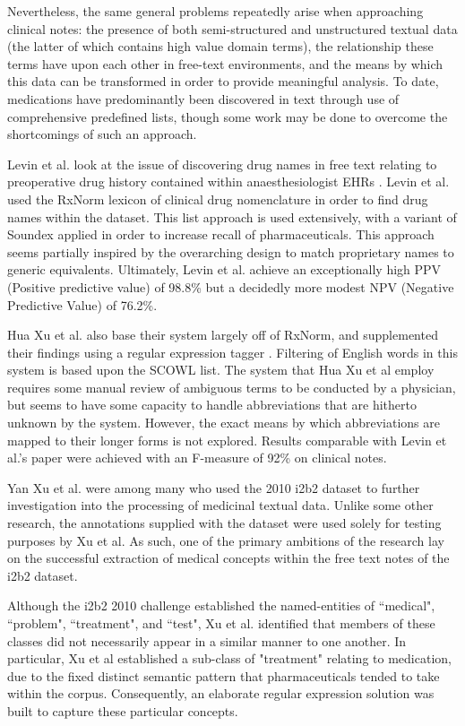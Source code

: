 Nevertheless, the same general problems repeatedly arise when approaching clinical notes: the presence of both semi-structured and unstructured textual data (the latter of which contains high value domain terms), the relationship these terms have upon each other in free-text environments, and the means by which this data can be transformed in order to provide meaningful analysis. To date, medications have predominantly been discovered in text through use of comprehensive predefined lists, though some work may be done to overcome the shortcomings of such an approach. 

Levin et al. look at the issue of discovering drug names in free text relating to preoperative drug history contained within anaesthesiologist EHRs \cite{levin2007extraction}. Levin et al. used the RxNorm lexicon of clinical drug nomenclature in order to find drug names within the dataset. This list approach is used extensively, with a variant of Soundex applied in order to increase recall of pharmaceuticals. This approach seems partially inspired by the overarching design to match proprietary names to generic equivalents. Ultimately, Levin et al. achieve an exceptionally high PPV (Positive predictive value) of 98.8\% but a decidedly more modest NPV (Negative Predictive Value) of 76.2\%. 

Hua Xu et al. also base their system largely off of RxNorm, and supplemented their findings using a regular expression tagger \cite{xu2010medex}. Filtering of English words in this system is based upon the SCOWL list. The system that Hua Xu et al employ requires some manual review of ambiguous terms to be conducted by a physician, but seems to have some capacity to handle abbreviations that are hitherto unknown by the system. However, the exact means by which abbreviations are mapped to their longer forms is not explored.  Results comparable with Levin et al.'s paper were achieved with an F-measure of 92\% on clinical notes. 

Yan Xu et al. were among many who used the 2010 i2b2 dataset to further investigation into the processing of medicinal textual data\cite{xu2012named}. Unlike some other research, the annotations supplied with the dataset were used solely for testing purposes by Xu et al. As such, one of the primary ambitions of the research lay on the successful extraction of medical concepts within the free text notes of the i2b2 dataset. 

Although the i2b2 2010 challenge established the named-entities of ``medical", ``problem", ``treatment", and ``test", Xu et al. identified that members of these classes did not necessarily appear in a similar manner to one another. In particular, Xu et al established a sub-class of "treatment" relating to medication, due to the fixed distinct semantic pattern that pharmaceuticals tended to take within the corpus. Consequently, an elaborate regular expression solution was built to capture these particular concepts.    

